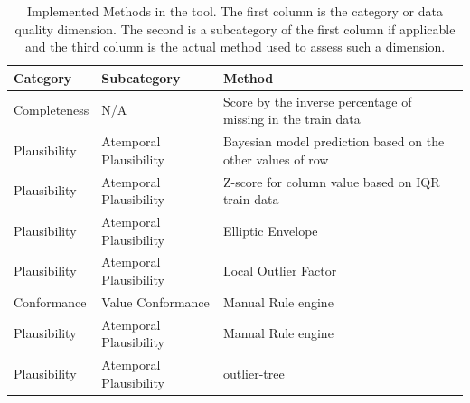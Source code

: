 
\begin{table}[htpb]
\caption{Implemented Methods in the tool. The first column is the category or data quality dimension. The second is a subcategory of the first column if applicable and the third column is the actual method used to assess such a dimension.} \label{tab:methods}
\renewcommand{\arraystretch}{1.4}
\setlength{\tabcolsep}{10pt}

\begin{tabularx}{\textwidth}{ p{2cm} p{3.5cm} X }
\hline
 Category   & Subcategory           & Method   \\ \hline
Completeness     & N/A               & Score by the inverse percentage of missing in the train data         \\ 
Plausibility & Atemporal Plausibility & Bayesian model prediction based on the other values of row \\ 
Plausibility & Atemporal Plausibility         & Z-score for column value based on IQR train data       \\    
Plausibility & Atemporal Plausibility           & Elliptic Envelope                       \\ 
Plausibility & Atemporal Plausibility           & Local Outlier Factor                \\ 
Conformance & Value Conformance           & Manual Rule engine                           \\ 
Plausibility & Atemporal Plausibility           & Manual Rule engine                      \\ 
Plausibility & Atemporal Plausibility           & outlier-tree                      \\ 
\hline
\end{tabularx}

\end{table}


